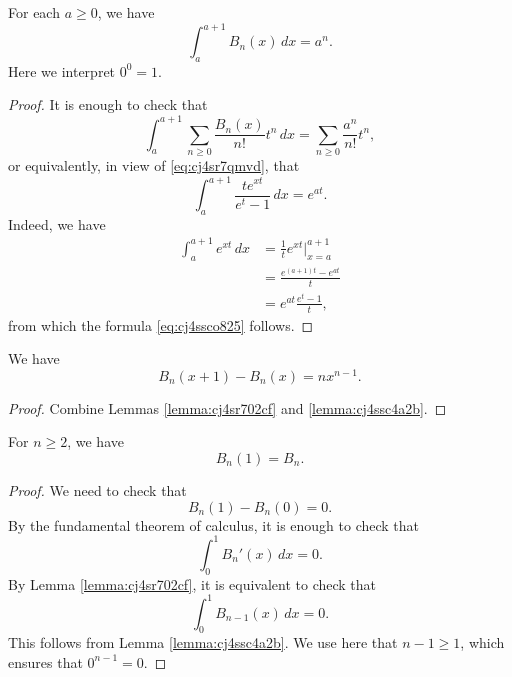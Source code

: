 \documentclass[reqno]{amsart} 
\begin{document}
\begin{lemma}\label{lemma:cj4ssc4a2b}
  For each $a \geq 0$, we have
  \begin{equation*}
    \int_a^{a+1} B_n(x) \, d x = a^n.
  \end{equation*}
  Here we interpret $0^0 = 1$.
\end{lemma}
\begin{proof}
  It is enough to check that
  \begin{equation*}
    \int_{a}^{a+1}
    \sum_{n \geq 0} \frac{B_n (x) }{ n ! } t^n
    \,d x
    = \sum_{n \geq 0} \frac{a^n}{n!} t^n,
  \end{equation*}
  or equivalently, in view of \eqref{eq:cj4sr7qmvd}, that
  \begin{equation}\label{eq:cj4ssco825}
    \int_{a}^{a + 1 }\frac{t e^{x t} }{ e^t - 1 } \, d x = e^{a t}.
  \end{equation}
  Indeed, we have
  \begin{align*}
    \int_a^{a + 1 } e^{x t } \, d x
    &=
    \frac{1}{t} e^{x t }|_{x=a}^{a+1} \\
    &=
    \frac{e^{(a+1) t} - e^{a t}}{t} \\
    &=
      e^{a t}
    \frac{e^t - 1}{t},
  \end{align*}
  from which the formula \eqref{eq:cj4ssco825} follows.
\end{proof}


\begin{lemma}\label{lemma:cj4vkapsln}
  We have
  \begin{equation*}
B_{n} (x + 1 ) - B_n (x) = n x^{n - 1}.
\end{equation*}
\end{lemma}
\begin{proof}
  Combine Lemmas \ref{lemma:cj4sr702cf} and \ref{lemma:cj4ssc4a2b}.
\end{proof}

\begin{lemma}
  For $n \geq 2$, we have
  \begin{equation*}
B_n (1) = B_n.
\end{equation*}
\end{lemma}
\begin{proof}
  We need to check that
  \begin{equation*}
    B_n(1) - B_n(0) = 0.
  \end{equation*}
  By the fundamental theorem of calculus, it is enough to check that
  \begin{equation*}
    \int_0^1 B_n'(x) \, d x = 0.
  \end{equation*}
  By Lemma \ref{lemma:cj4sr702cf}, it is equivalent to check that
  \begin{equation*}
    \int_0^1 B_{n - 1 } (x) \, d x = 0.
  \end{equation*}
  This follows from Lemma \ref{lemma:cj4ssc4a2b}.  We use here that $n-1 \geq 1$, which ensures that $0^{n-1} = 0$.
\end{proof}
\end{document}
